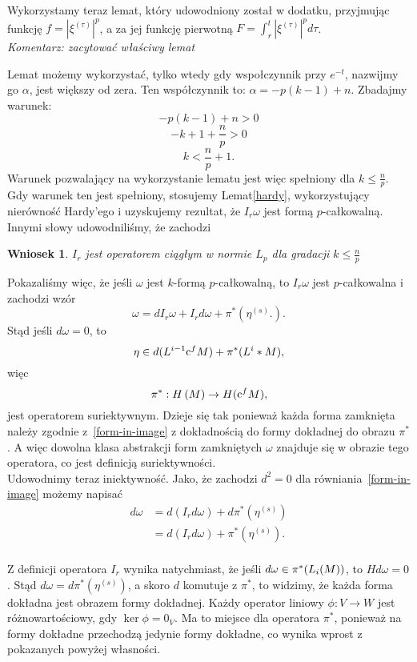 \documentclass[licencjacka]{pracamgr}
\theoremstyle{definition}
\theoremstyle{definition}
\theoremstyle{plain}
\theoremstyle{plain}
\theoremstyle{plain}
\theoremstyle{plain}
\newtheorem{wniosek}{Wniosek}[section]
\def\cfm{\ensuremath\mathrm{c}^fM}
\def\M{\ensuremath M}
\begin{document}
Wykorzystamy teraz lemat, który udowodniony został w dodatku, przyjmując
funkcję $f = |\xi^{(\tau)} |^p$, a za jej funkcję pierwotną 
$F = \int_r^t |\xi^{(\tau)}|^p d \tau $. \\
\emph{Komentarz: zacytować właściwy lemat}

Lemat możemy wykorzystać, tylko wtedy gdy 
wspołczynnik przy $e^{-t}$, nazwijmy go $\alpha$, jest większy od zera. Ten współczynnik to:
$\alpha = -p(k-1) + n$. Zbadajmy warunek:
\[
    -p(k-1) + n > 0
\]
\[
    -k + 1 + \frac{n}{p} > 0
\]
\[
    k < \frac{n}{p} + 1.
\]
Warunek pozwalający na wykorzystanie lematu jest więc spełniony dla $k \leq
\frac{n}{p}$. \\

Gdy warunek ten jest spełniony, stosujemy Lemat\ref{hardy},
wykorzystujący nierówność Hardy'ego i uzyskujemy rezultat, że $I_r \omega$ jest formą $p$-całkowalną. \\
Innymi słowy udowodniliśmy, że zachodzi
\begin{wniosek}
$I_r$ jest operatorem ciągłym w normie $L_p$ dla gradacji $k \leq \frac{n}{p}$
\end{wniosek}

Pokazaliśmy więc, że jeśli $\omega$ jest $k$-formą $p$-całkowalną, to  $I_r \omega$ jest
$p$-całkowalna i zachodzi wzór
\[
    \omega = dI_r \omega + I_r d \omega + \pi^\ast 
    \left(
        \eta^{(s)}.
    \right).
\]
Stąd jeśli $d \omega = 0$, to 
\[\label{form-in-image}
    \eta \in d(L^{i-1} \cfm) + \pi^\ast (L^i*\M),
\]
więc 
\[
    \pi^\ast: H \left( \M \right) \rightarrow H ( \cfm ),
\]
jest operatorem suriektywnym. Dzieje się tak ponieważ każda forma zamknięta
należy zgodnie z~\ref{form-in-image} z dokładnością do formy dokładnej do
obrazu $\pi^\ast$. A więc dowolna klasa abstrakcji form zamkniętych $\omega$
znajduje się w obrazie tego operatora, co jest definicją suriektywności. \\

Udowodnimy teraz iniektywność.
Jako, że zachodzi $d^2 = 0$ dla równiania~\ref{form-in-image}
możemy napisać
\begin{align*}
d \omega &= d(I_rd\omega) + d\pi^\ast( \eta^{(s)}) \\
         &= d(I_rd\omega) + \pi^\ast( \eta^{(s)}). \\
\end{align*}

Z definicji operatora $I_r$ wynika natychmiast, że jeśli
 $d \omega \in \pi^\ast(L_i(\M))$, to $Hd\omega = 0$.
Stąd $d \omega = d \pi^\ast(\eta^{(s)})$, a skoro $d$ komutuje z $\pi^\ast$,
to widzimy, że każda forma dokładna jest obrazem formy dokładnej. 
Każdy operator liniowy $\phi: V \rightarrow W$ jest różnowartościowy, gdy
$\ker \phi = 0_V$. Ma to miejsce dla operatora $\pi^\ast$, ponieważ
na formy dokładne przechodzą jedynie formy dokładne, co wynika wprost z pokazanych
powyżej własności. \\
\end{document}
